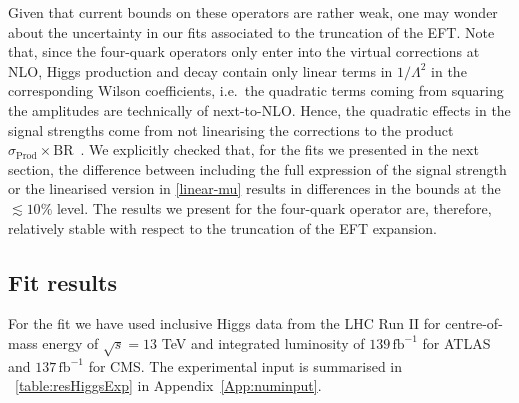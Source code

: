 Given that current bounds on these operators are rather weak, one may wonder about the uncertainty in our fits associated to the truncation of the EFT.
Note that, since the four-quark operators only enter into the virtual corrections at NLO, Higgs production and decay contain only linear terms in $1/\Lambda^{2}$ in the corresponding Wilson coefficients, i.e.~the quadratic terms coming from squaring the amplitudes are technically of next-to-NLO. 
Hence, the quadratic effects in the signal strengths come from not linearising the corrections to the product $\sigma_\mathrm{ Prod} \times \mathrm{ BR}$~\!.  
We explicitly checked that, for the fits we presented in the next section, the difference between including the full expression of the signal strength or the linearised version in \eqref{linear-mu} results in differences in the bounds at the $\lesssim10\%$ level. The results we present for the four-quark operator are, therefore, relatively stable with respect to the truncation of the EFT expansion. 
\subsection{Fit results}
\par 
For the fit we have used inclusive Higgs data from the LHC Run II for centre-of-mass energy of $\sqrt{s} = 13$ TeV and  integrated luminosity of $ 139\, \mathrm{fb}^{-1}$ for ATLAS and  $ 137\,\mathrm{fb}^{-1}$ for CMS.  The experimental input is summarised in ~\autoref{table:resHiggsExp} in Appendix~\ref{App:numinput}.  

